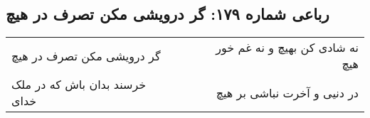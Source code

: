 \begin{center}
\section*{رباعی شماره ۱۷۹: گر درویشی مکن تصرف در هیچ}
\label{sec:sh179}
\begin{longtable}{l p{0.5cm} r}
گر درویشی مکن تصرف در هیچ
&&
نه شادی کن بهیچ و نه غم خور هیچ
\\
خرسند بدان باش که در ملک خدای
&&
در دنیی و آخرت نباشی بر هیچ
\\
\end{longtable}
\end{center}

